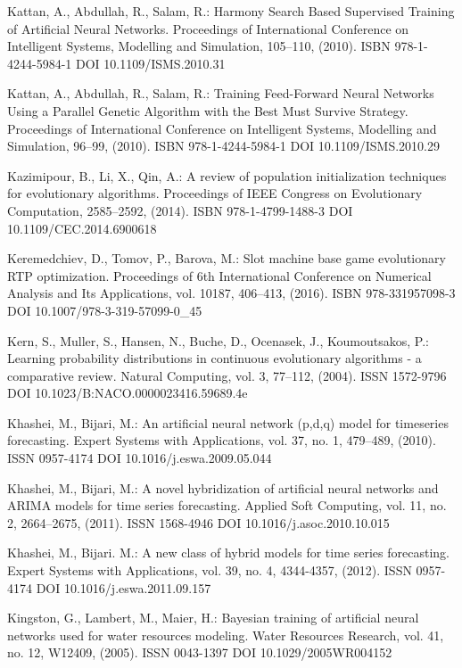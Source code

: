 \begin{thebibliography}{99.}
 Kattan, A., Abdullah, R., Salam, R.: Harmony Search Based Supervised Training of Artificial Neural Networks. Proceedings of International Conference on Intelligent Systems, Modelling and Simulation, 105--110, (2010). ISBN 978-1-4244-5984-1 DOI 10.1109/ISMS.2010.31

 Kattan, A., Abdullah, R., Salam, R.: Training Feed-Forward Neural Networks Using a Parallel Genetic Algorithm with the Best Must Survive Strategy. Proceedings of International Conference on Intelligent Systems, Modelling and Simulation, 96--99, (2010). ISBN 978-1-4244-5984-1 DOI 10.1109/ISMS.2010.29

 Kazimipour, B., Li, X., Qin, A.: A review of population initialization techniques for evolutionary algorithms. Proceedings of IEEE Congress on Evolutionary Computation, 2585--2592, (2014). ISBN 978-1-4799-1488-3 DOI 10.1109/CEC.2014.6900618

 Keremedchiev, D., Tomov, P., Barova, M.: Slot machine base game evolutionary RTP optimization. Proceedings of 6th International Conference on Numerical Analysis and Its Applications, vol. 10187, 406--413, (2016). ISBN 978-331957098-3 DOI 10.1007/978-3-319-57099-0\_45

 Kern, S., Muller, S., Hansen, N., Buche, D., Ocenasek, J., Koumoutsakos, P.: Learning probability distributions in continuous evolutionary algorithms - a comparative review. Natural Computing, vol. 3, 77--112, (2004). ISSN 1572-9796 DOI 10.1023/B:NACO.0000023416.59689.4e

 Khashei, M., Bijari, M.: An artificial neural network (p,d,q) model for timeseries forecasting. Expert Systems with Applications, vol. 37, no. 1, 479--489, (2010). ISSN 0957-4174 DOI 10.1016/j.eswa.2009.05.044

 Khashei, M., Bijari, M.: A novel hybridization of artificial neural networks and ARIMA models for time series forecasting. Applied Soft Computing, vol. 11, no. 2, 2664--2675, (2011). ISSN 1568-4946 DOI 10.1016/j.asoc.2010.10.015

 Khashei, M., Bijari. M.: A new class of hybrid models for time series forecasting. Expert Systems with Applications, vol. 39, no. 4, 4344-4357, (2012). ISSN 0957-4174 DOI 10.1016/j.eswa.2011.09.157

 Kingston, G., Lambert, M., Maier, H.: Bayesian training of artificial neural networks used for water resources modeling. Water Resources Research, vol. 41, no. 12, W12409, (2005). ISSN 0043-1397 DOI 10.1029/2005WR004152


\end{thebibliography}
